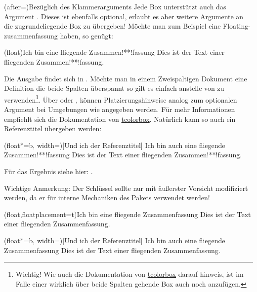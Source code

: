 \documentclass[ngerman]{article}
\def\cmd#1{\texttt{\paletteA{\textbackslash#1}}}
\def\env#1{\texttt{\paletteB{#1}}}
\def\arg#1{\textit{\paletteB{#1}}}
\begin{document}
\begin{bemerkung*}(after=\bigskip){Bezüglich des Klammerarguments}
    \label{bem:optbracekey}Jede Box unterstützt auch das Argument \arg{Boxargs}. Dieses ist ebenfalls optional, erlaubt es aber weitere Argumente an die zugrundeliegende Box zu übergeben!
    Möchte man zum Beispiel eine Floating-zusammenfassung haben, so genügt:
\begin{latex}
\begin{zusammenfassung}(float){Ich bin eine fliegende Zusammen!**!fassung}
    Dies ist der Text einer fliegenden Zusammen!**!fassung.
\end{zusammenfassung}
\end{latex}
    Die Ausgabe findet sich in .
    Möchte man in einem Zweispaltigen Dokument eine Definition die beide Spalten überspannt so gilt es einfach  anstelle von  zu verwenden\footnote{Wichtig! Wie auch die Dokumentation von \href{https://www.ctan.org/pkg/tcolorbox}{tcolorbox} darauf hinweis, ist im Falle einer wirklich über beide Spalten gehende Box auch noch \T{width=\cmd{textwidth}} anzufügen.}. Über  oder , können Platzierungshinweise analog zum optionalen Argument bei Umgebungen wie \env{figure} angegeben werden. Für mehr Informationen empfiehlt sich die Dokumentation von \href{https://www.ctan.org/pkg/tcolorbox}{tcolorbox}.
    Natürlich kann so auch ein Referenztitel übergeben werden:
\begin{latex}
\begin{zusammenfassung}(float*=b, width=\textwidth)[Und ich der Referenztitel]
            {Ich bin auch eine fliegende Zusammen!**!fassung}
    Dies ist der Text einer fliegenden Zusammen!**!fassung.
\end{zusammenfassung}
\end{latex}
Für das Ergebnis siehe hier: .

Wichtige Anmerkung: Der Schlüssel  sollte nur mit äußerster Vorsicht modifiziert werden, da er für interne Mechaniken des Pakets verwendet werden!
\end{bemerkung*}

\begin{zusammenfassung}(float,floatplacement=t){Ich bin eine fliegende Zusammenfassung}
    \label{zsf:floatingex}Dies ist der Text einer fliegenden Zusammenfassung.
\end{zusammenfassung}

\begin{zusammenfassung}(float*=b, width=\textwidth)[Und ich der Referenztitel]
            {Ich bin auch eine fliegende Zusammenfassung}
    \label{zsf:floatingex2}Dies ist der Text einer fliegenden Zusammenfassung.
\end{zusammenfassung}
\end{document}
